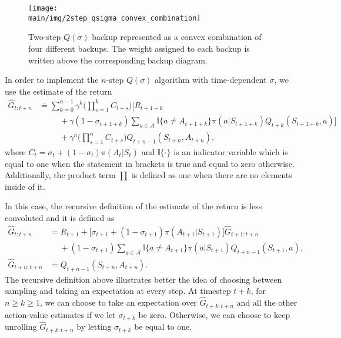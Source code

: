 \begin{figure}[t]
    \centering
    \texttt{[image: \\main/img/2step\_qsigma\_convex\_combination]}
    \caption[Two-Step Q(Sigma) as a Convex Combination] {
    Two-step $Q(\sigma)$ backup represented as a convex combination of four
    different backups.
    The weight assigned to each backup is written above the corresponding backup diagram.
    } 
    \label{fig:twostep_qsigma_convex_comb}
\end{figure}

In order to implement the $n$-step $Q(\sigma)$ algorithm with time-dependent $\sigma$, we use the estimate of the return
%
\begin{align}
\label{eq:nstep_qsigma_return}
\hat{G}_{t:t+n} &\overset{.}{=} \sum_{k=0}^{n-1} \gamma^{k}  
	\big(\prod_{s=1}^{k} C_{t+s}\big) \big[R_{t+1+k} \nonumber  \\
& \hspace{30pt} +\gamma (1-\sigma_{t+1+k}) \sum_{a\in\mathcal{A}}\mathbb{I}\{a \neq A_{t+1+k}\} 
	\pi(a|S_{t+1+k}) Q_{t+k}(S_{t+1+k},a) \big] \nonumber \\
& \hspace{30pt} +\gamma^n \big(\prod_{s=1}^{n} C_{t+s}\big) Q_{t+n-1}(S_{t+n}, A_{t+n}),
\end{align}
%
where $C_t = \sigma_{t} + (1-\sigma_t)\pi(A_t|S_t)$ and $\mathbb{I}\{ \cdot \}$ is an indicator variable which is equal to one when the statement in brackets is true and equal to zero otherwise. 
Additionally, the product term $\prod$ is defined as one when there are no elements inside of it.

In this case, the recursive definition of the estimate of the return is less convoluted and it is defined as
%
\begin{align}
\label{eq:recursive_nstep_return}
\hat{G}_{t:t+n} &\overset{.}{=} R_{t+1} + \big[ \sigma_{t+1} + (1-\sigma_{t+1})\pi(A_{t+1}|S_{t+1}) \big]
	\hat{G}_{t+1:t+n} \nonumber \\
&\hspace{15pt}
	+ (1-\sigma_{t+1}) \sum_{a \in \mathcal{A}} \mathbb{I}\{ a \neq A_{t+1} \} \pi(a|S_{t+1}) 
	Q_{t+n-1}(S_{t+1}, a),
	\nonumber \\
\hat{G}_{t+n:t+n} &\overset{.}{=} Q_{t+n-1}(S_{t+n}, A_{t+n}).
\end{align}
%
The recursive definition above illustrates better the idea of choosing between sampling and taking an expectation at every step.
At timestep $t+k$, for $n \geq k \geq 1$, we can choose to take an expectation over $\hat{G}_{t+k:t+n}$ and all the other action-value estimates if we let $\sigma_{t+k}$ be zero.
Otherwise, we can choose to keep unrolling $\hat{G}_{t+k:t+n}$ by letting $\sigma_{t+k}$ be equal to one. 

